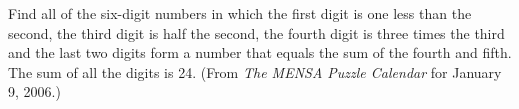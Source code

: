 Find all of the six-digit numbers in which the first digit is one less than the second, the third digit is half the second, the fourth digit is three times the third and the last two digits form a number that equals the sum of the fourth and fifth.  The sum of all the digits is 24.  (From {\sl The MENSA Puzzle Calendar} for January 9, 2006.)